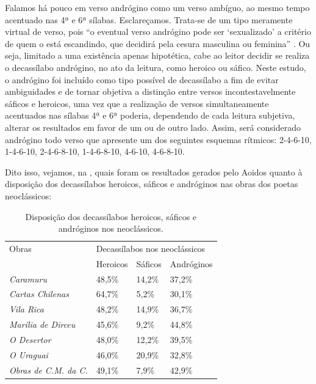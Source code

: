 \documentclass[portuguese]{textolivre}
\begin{document}
Falamos há pouco em verso andrógino como um verso ambíguo, ao mesmo tempo acentuado nas 4ª e 6ª sílabas. Esclareçamos. Trata-se de um tipo meramente virtual de verso, pois “o eventual verso andrógino pode ser ‘sexualizado’ a critério de quem o está escandindo, que decidirá pela cesura masculina ou feminina” \cite[p.~72]{mattoso2010sexo}. Ou seja, limitado a uma existência apenas hipotética, cabe ao leitor decidir se realiza o decassílabo andrógino, no ato da leitura, como heroico ou sáfico. Neste estudo, o andrógino foi incluído como tipo possível de decassílabo a fim de evitar ambiguidades e de tornar objetiva a distinção entre versos incontestavelmente sáficos e heroicos, uma vez que a realização de versos simultaneamente acentuados nas sílabas 4ª e 6ª poderia, dependendo de cada leitura subjetiva, alterar os resultados em favor de um ou de outro lado. Assim, será considerado andrógino todo verso que apresente um dos seguintes esquemas rítmicos: 2-4-6-10, 1-4-6-10, 2-4-6-8-10, 1-4-6-8-10, 4-6-10, 4-6-8-10.

Dito isso, vejamos, na , quais foram os resultados gerados pelo Aoidos quanto à disposição dos decassílabos heroicos, sáficos e andróginos nas obras dos poetas neoclássicos:

\begin{table}[htbp]
\centering
\begin{threeparttable}
\caption{Disposição dos decassílabos heroicos, sáficos e andróginos nos neoclássicos.}
\label{tbl1}
\begin{tabular}{llll}
\toprule
Obras & \multicolumn{3}{l}{Decassílabos nos neoclássicos} \\
& Heroicos & Sáficos & Andróginos \\
\midrule
\textit{Caramuru} & 48,5\% & 14,2\% & 37,2\% \\ 
\textit{Cartas Chilenas} & 64,7\% & 5,2\% & 30,1\% \\
\textit{Vila Rica} & 48,2\% & 14,9\% & 36,7\% \\
\textit{Marília de Dirceu} & 45,6\% & 9,2\% & 44,8\% \\
\textit{O Desertor} & 48,0\% & 12,2\% & 39,5\% \\
\textit{O Uraguai} & 46,0\% & 20,9\% & 32,8\% \\
\textit{Obras de C.M. da C.} & 49,1\% & 7,9\% & 42,9\% \\
\bottomrule
\end{tabular}
\end{threeparttable}
\end{table}
\end{document}

